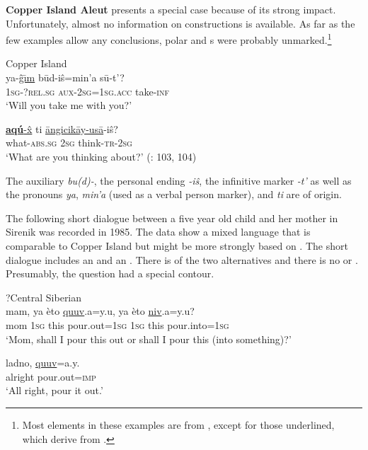 \textbf{Copper Island Aleut} presents a special case because of its strong  impact. Unfortunately, almost no information on  constructions is available. As far as the few examples allow any conclusions, polar and s were probably unmarked.\footnote{Most elements in these examples are from , except for those underlined, which derive from .}

\ea%
    \label{ex:eska:4}
    Copper Island \\
    \ea
    \gll ya-\uline{\^{g}\={\i}m} b\=ud-i\^{s}=min’a    s\=u{-t’?}\\
    1\textsc{sg}-?\textsc{rel}.\textsc{sg}  \textsc{aux}-2\textsc{sg=}1\textsc{sg.acc}  take-\textsc{inf}\\
    \glt ‘Will you take me with you?’
    
    \ex
    \gll \uline{\textbf{{aqú}}-\^{x}} ti  \uline{\=angicik\=ay-us\=a}-i\^{s}?\\
    what-\textsc{abs}.\textsc{sg}  2\textsc{sg}  think-\textsc{tr-}2\textsc{sg}\\
    \glt ‘What are you thinking about?’ (\citealt{Golovko1990}: 103, 104)
    \z
    \z

\noindent The auxiliary \textit{bu(d)-}, the personal ending \textit{-i\^s}, the infinitive marker \textit{-t’} as well as the pronouns \textit{ya}, \textit{min’a} (used as a verbal person marker), and \textit{ti} are of  origin.

The following short dialogue between a five year old child and her mother in Sirenik was recorded in 1985. The data show a mixed language that is comparable to Copper Island  but might be more strongly based on . The short dialogue includes an  and an . There is  of the two alternatives and there is no  or . Presumably, the question had a special  contour.

\ea%
    \label{ex:eska:5}
    ?Central Siberian \\
    \ea
    \gll mam,  ya   èto  \uline{quuv}.a=y.u,    ya  èto  \uline{niv}.a=y.u?\\
    mom  1\textsc{sg}  this  pour.out=1\textsc{sg}    1\textsc{sg}  this  pour.into=1\textsc{sg}\\
    \glt ‘Mom, shall I pour this out or shall I pour this (into something)?’
    
    \ex
    \gll ladno,  \uline{quuv}=a.y.\\
    alright  pour.out=\textsc{imp}\\
    \glt ‘All right, pour it out.’ \citep[324]{Vakhtin1998}
    \z
    \z

